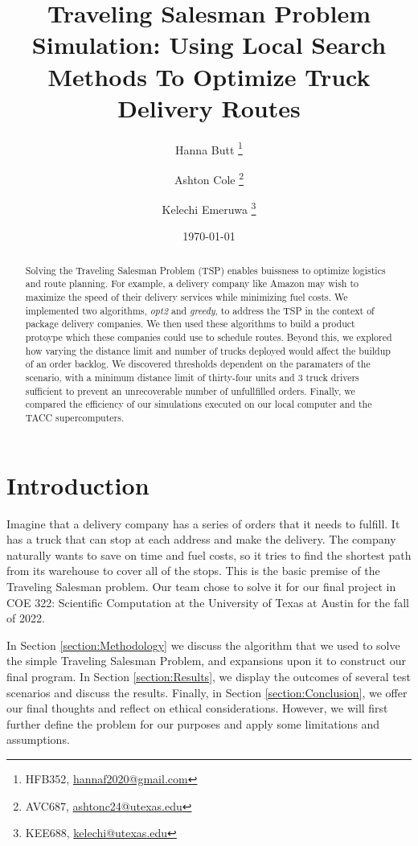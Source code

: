 \documentclass[letterpaper]{article}
\title{Traveling Salesman Problem Simulation: Using Local Search Methods To Optimize Truck Delivery Routes }
\author{Hanna Butt \thanks{HFB352, \href{mailto:hannaf2020@gmail.com}{hannaf2020@gmail.com}} \and Ashton Cole \thanks{AVC687, \href{mailto:ashtonc24@utexas.edu}{ashtonc24@utexas.edu}} \and Kelechi Emeruwa \thanks{KEE688, \href{mailto:kelechi@utexas.edu}{kelechi@utexas.edu}}}
\date{\today}
\begin{document}
    \maketitle

    \begin{abstract}
        Solving the Traveling Salesman Problem (TSP) enables buissness to optimize logistics and route planning. For example, a delivery company like Amazon may wish to maximize the speed of their delivery services while minimizing fuel costs. We implemented two algorithms, \emph{opt2} and \emph{greedy}, to address the TSP in the context of package delivery companies. We then used these algorithms to build a product protoype which these companies could use to schedule routes. Beyond this, we explored how varying the distance limit and number of trucks deployed would affect the buildup of an order backlog. We discovered thresholds dependent on the paramaters of the scenario, with a minimum distance limit of thirty-four units and 3 truck drivers sufficient to prevent an unrecoverable number of unfullfilled orders. Finally, we compared the efficiency of our simulations executed on our local computer and the TACC supercomputers.
    \end{abstract}

    \section{Introduction}
    \label{section:Introduction}
    Imagine that a delivery company has a series of orders that it needs to fulfill. It has a truck that can stop at each address and make the delivery. The company naturally wants to save on time and fuel costs, so it tries to find the shortest path from its warehouse to cover all of the stops. This is the basic premise of the Traveling Salesman problem. Our team chose to solve it for our final project in COE 322: Scientific Computation at the University of Texas at Austin for the fall of 2022.
    
    In Section \ref{section:Methodology} we discuss the algorithm that we used to solve the simple Traveling Salesman Problem, and expansions upon it to construct our final program. In Section \ref{section:Results}, we display the outcomes of several test scenarios and discuss the results. Finally, in Section \ref{section:Conclusion}, we offer our final thoughts and reflect on ethical considerations. However, we will first further define the problem for our purposes and apply some limitations and assumptions.
\end{document}
